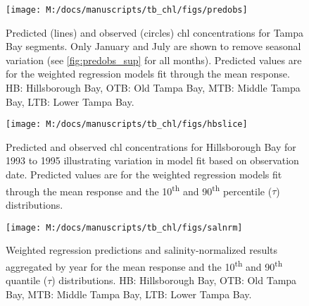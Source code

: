 \documentclass{svjour3}\usepackage[]{graphicx}\usepackage[]{color}
\begin{document}
\begin{figure}[!ht]


{\centering \texttt{[image: M:/docs/manuscripts/tb\_chl/figs/predobs]} 

}

\caption[Predicted (lines) and observed (circles) \ac{chl} concentrations for Tampa Bay segments]{Predicted (lines) and observed (circles) \ac{chl} concentrations for Tampa Bay segments. Only January and July are shown to remove seasonal variation (see \cref{fig:predobs_sup} for all months).  Predicted values are for the weighted regression models fit through the mean response. HB: Hillsborough Bay, OTB: Old Tampa Bay, MTB: Middle Tampa Bay, LTB: Lower Tampa Bay.\label{fig:predobs}}
\end{figure}



\begin{figure}[!ht]


{\centering \texttt{[image: M:/docs/manuscripts/tb\_chl/figs/hbslice]} 

}

\caption[Predicted and observed \ac{chl} concentrations for Hillsborough Bay for 1993 to 1995 illustrating variation in model fit based on observation date]{Predicted and observed \ac{chl} concentrations for Hillsborough Bay for 1993 to 1995 illustrating variation in model fit based on observation date. Predicted values are for the weighted regression models fit through the mean response and the 10\textsuperscript{th} and 90\textsuperscript{th} percentile ($\tau$) distributions.\label{fig:hbslice}}
\end{figure}



\begin{figure}[!ht]


{\centering \texttt{[image: M:/docs/manuscripts/tb\_chl/figs/salnrm]} 

}

\caption[Weighted regression predictions and salinity-normalized results aggregated by year for the mean response and the 10\textsuperscript{th} and 90\textsuperscript{th} quantile ($\tau$) distributions]{Weighted regression predictions and salinity-normalized results aggregated by year for the mean response and the 10\textsuperscript{th} and 90\textsuperscript{th} quantile ($\tau$) distributions. HB: Hillsborough Bay, OTB: Old Tampa Bay, MTB: Middle Tampa Bay, LTB: Lower Tampa Bay.\label{fig:salnrm}}
\end{figure}
\end{document}
